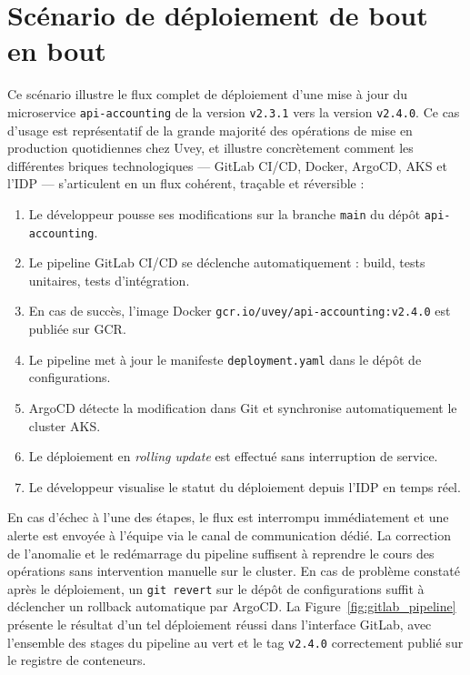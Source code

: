 \section{Scénario de déploiement de bout en bout}
\label{sec:use_case_deploy}

\noindent Ce scénario illustre le flux complet de déploiement d'une mise à jour du microservice \texttt{api-accounting} de la version \texttt{v2.3.1} vers la version \texttt{v2.4.0}. Ce cas d'usage est représentatif de la grande majorité des opérations de mise en production quotidiennes chez Uvey, et illustre concrètement comment les différentes briques technologiques --- GitLab \ac{CI/CD}, Docker, ArgoCD, \ac{AKS} et l'\ac{IDP} --- s'articulent en un flux cohérent, traçable et réversible :

\begin{enumerate}
  \item Le développeur pousse ses modifications sur la branche \texttt{main} du dépôt \texttt{api-accounting}.
  \item Le pipeline GitLab \ac{CI/CD} se déclenche automatiquement : build, tests unitaires, tests d'intégration.
  \item En cas de succès, l'image Docker \texttt{gcr.io/uvey/api-accounting:v2.4.0} est publiée sur \ac{GCR}.
  \item Le pipeline met à jour le manifeste \texttt{deployment.yaml} dans le dépôt de configurations.
  \item ArgoCD détecte la modification dans Git et synchronise automatiquement le cluster \ac{AKS}.
  \item Le déploiement en \textit{rolling update} est effectué sans interruption de service.
  \item Le développeur visualise le statut du déploiement depuis l'\ac{IDP} en temps réel.
\end{enumerate}

\noindent En cas d'échec à l'une des étapes, le flux est interrompu immédiatement et une alerte est envoyée à l'équipe via le canal de communication dédié. La correction de l'anomalie et le redémarrage du pipeline suffisent à reprendre le cours des opérations sans intervention manuelle sur le cluster. En cas de problème constaté après le déploiement, un \texttt{git revert} sur le dépôt de configurations suffit à déclencher un rollback automatique par ArgoCD. La Figure~\ref{fig:gitlab_pipeline} présente le résultat d'un tel déploiement réussi dans l'interface GitLab, avec l'ensemble des stages du pipeline au vert et le tag \texttt{v2.4.0} correctement publié sur le registre de conteneurs.

